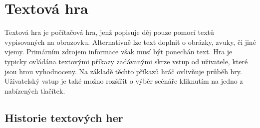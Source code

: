 \documentclass[main.tex]{subfiles}
\begin{document}
\section{Textová hra}
Textová hra je počítačová hra, jenž popisuje děj pouze pomocí textů vypisovaných na obrazovku. Alternativně lze text doplnit o obrázky, zvuky, či jiné vjemy. Primárním zdrojem informace však musí být ponechán text. Hra je typicky ovládána textovými příkazy zadávanými skrze vstup od uživatele, které jsou hrou vyhodnoceny. Na základě těchto příkazů hráč ovlivňuje průběh hry. Uživatelský vstup je také možno rozšířit o výběr scénáře kliknutím na jedno z nabízených tlačítek.

\subsection{Historie textových her}
\end{document}
